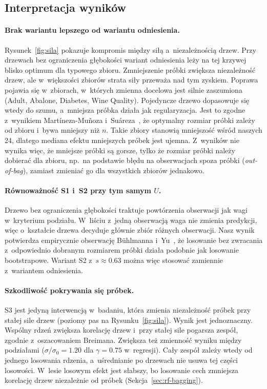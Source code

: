 \subsection{Interpretacja wyników}

\paragraph{Brak wariantu lepszego od wariantu odniesienia.} Rysunek~\ref{fig:sila} pokazuje kompromis między siłą a~niezależnością drzew. Przy drzewach bez ograniczenia głębokości wariant odniesienia leży na tej krzywej blisko optimum dla typowego zbioru. Zmniejszenie próbki zwiększa niezależność drzew, ale w~większości zbiorów strata siły przeważa nad tym zyskiem. Poprawa pojawia się w~zbiorach, w~których zmienna docelowa jest silnie zaszumiona (Adult, Abalone, Diabetes, Wine Quality). Pojedyncze drzewo dopasowuje się wtedy do szumu, a~mniejsza próbka działa jak regularyzacja. Jest to zgodne z~wynikiem Martíneza-Muñoza i~Suáreza~\cite{martinez2010}, że optymalny rozmiar próbki zależy od zbioru i~bywa mniejszy niż $n$. Takie zbiory stanowią mniejszość wśród naszych 24, dlatego mediana efektu mniejszych próbek jest ujemna. Z~wyników nie wynika więc, że mniejsze próbki są gorsze, tylko że rozmiar próbki należy dobierać dla zbioru, np.\ na podstawie błędu na obserwacjach spoza próbki (\emph{out-of-bag}), zamiast zmieniać go dla wszystkich zbiorów jednakowo.

\paragraph{Równoważność S1 i~S2 przy tym samym $U$.} Drzewo bez ograniczenia głębokości traktuje powtórzenia obserwacji jak wagi w~kryterium podziału. W~liściu z~jedną obserwacją waga nie zmienia predykcji, więc o~kształcie drzewa decyduje głównie zbiór różnych obserwacji. Nasz wynik potwierdza empirycznie obserwację Bühlmanna i~Yu~\cite{buhlmann2002}, że losowanie bez zwracania z~odpowiednio dobranym rozmiarem próbki działa podobnie jak losowanie bootstrapowe. Wariant S2 z~$s\approx0.63$ można więc stosować zamiennie z~wariantem odniesienia.

\paragraph{Szkodliwość pokrywania się próbek.} S3 jest jedyną interwencją w~badaniu, która zmienia niezależność próbek przy stałej sile drzew (poziomy pas na Rysunku~\ref{fig:sila}). Wynik jest jednoznaczny. Wspólny rdzeń zwiększa korelację drzew i~przy stałej sile pogarsza zespół, zgodnie z~oszacowaniem Breimana. Zwiększa też zmienność wyniku między podziałami ($\sigma/\sigma_0=1.20$ dla $\gamma=0.75$ w~regresji). Cały zespół zależy wtedy od jednego losowania rdzenia, a~uśrednianie po drzewach nie usuwa tej części losowości. W~lesie losowym efekt jest słabszy, bo losowanie cech zmniejsza korelację drzew niezależnie od próbek (Sekcja~\ref{sec:rf-bagging}).

